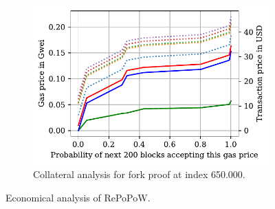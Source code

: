 \begin{figure}[!h]
\begin{subfigure}{0.9\linewidth}
    \begin{center}
        \includegraphics[width=1\columnwidth]{figures/cryptoeconomics-650K.pdf}
    \end{center}
    \caption{Collateral analysis for fork proof at index 650.000.}
    \label{fig:cryptoeconomics-650K}
\end{subfigure}
\caption{Economical analysis of RePoPoW.}
\label{fig:cryptoeconomics}
\end{figure}
